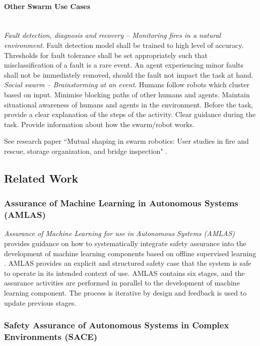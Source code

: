 \documentclass[lettersize,journal]{IEEEtran}
\begin{document}
\paragraph*{Other Swarm Use Cases}
\emph{\\Fault detection, diagnosis and recovery – Monitoring fires in a natural environment}. Fault detection model shall be trained to high level of accuracy. Thresholds for fault tolerance shall be set appropriately such that misclassification of a fault is a rare event. An agent experiencing minor faults shall not be immediately removed, should the fault not impact the task at hand. \\
\emph{\noindent Social swarm – Brainstorming at an event}. Humans follow robots which cluster based on input. Minimise blocking paths of other humans and agents. Maintain situational awareness of humans and agents in the environment. Before the task, provide a clear explanation of the steps of the activity. Clear guidance during the task. Provide information about how the swarm/robot works.

\noindent See research paper ``Mutual shaping in swarm robotics: User studies in fire and rescue, storage organization, and bridge inspection" \cite{Carrillo-Zapata2020}.

\subsection{Related Work}\label{relatedwork}

\subsubsection{Assurance of Machine Learning in Autonomous Systems (AMLAS)}
\textit{Assurance of Machine Learning for use in Autonomous Systems (AMLAS)} provides guidance on how to systematically integrate safety assurance into the development of machine learning components based on offline supervised learning \cite{AMLAS2021}. 
AMLAS provides an explicit and structured safety case that the system is safe to operate in its intended context of use. 
AMLAS contains six stages, and the assurance activities are performed in parallel to the development of machine learning component. 
The process is iterative by design and feedback is used to update previous stages. 

\subsubsection{Safety Assurance of Autonomous Systems in Complex Environments (SACE)}
\cite{SACE2022}
\end{document}
